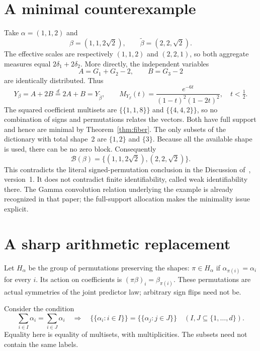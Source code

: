\documentclass[11pt]{article}
\theoremstyle{definition}\newtheorem{definition}[theorem]{Definition}
\theoremstyle{remark}\newtheorem{remark}[theorem]{Remark}
\newcommand{\B}{\mathcal B}
\newcommand{\eqd}{\overset{d}{=}}
\newcommand{\multiset}[1]{\{\!\{#1\}\!\}}
\begin{document}
\section{A minimal counterexample}\label{sec:counterexample}
Take $\alpha=(1,1,2)$ and
\[
 \beta=(1,1,2\sqrt2),\qquad \widetilde\beta=(2,2,\sqrt2).
\]
The effective scales are respectively $(1,1,2)$ and $(2,2,1)$, so both aggregate measures equal $2\delta_1+2\delta_2$. More directly, the independent variables
\[
 A=G_1+G_2-2,\qquad B=G_3-2
\]
are identically distributed. Thus
\[
 Y_\beta=A+2B\eqd2A+B=Y_{\widetilde\beta},\qquad
 M_{Y_\beta}(t)=\frac{e^{-6t}}{(1-t)^2(1-2t)^2},\quad t<\tfrac12.
\]
The squared coefficient multisets are $\multiset{1,1,8}$ and $\multiset{4,4,2}$, so no combination of signs and permutations relates the vectors. Both have full support and hence are minimal by Theorem~\ref{thm:fiber}. The only subsets of the dictionary with total shape~2 are $\{1,2\}$ and $\{3\}$. Because all the available shape is used, there can be no zero block. Consequently
\[
 \B(\beta)=\{(1,1,2\sqrt2),(2,2,\sqrt2)\}.
\]
This contradicts the literal signed-permutation conclusion in the Discussion of~\cite{BSS}, version~1. It does not contradict finite identifiability, called weak identifiability there. The Gamma convolution relation underlying the example is already recognized in that paper; the full-support allocation makes the minimality issue explicit.

\section{A sharp arithmetic replacement}
Let $H_\alpha$ be the group of permutations preserving the shapes: $\pi\in H_\alpha$ if $\alpha_{\pi(i)}=\alpha_i$ for every $i$. Its action on coefficients is $(\pi\beta)_i=\beta_{\pi(i)}$. These permutations are actual symmetries of the joint predictor law; arbitrary sign flips need not be.

Consider the condition
\begin{equation}\tag{SR}\label{eq:SR}
 \sum_{i\in I}\alpha_i=\sum_{i\in J}\alpha_i
 \quad\Longrightarrow\quad
 \multiset{\alpha_i:i\in I}=\multiset{\alpha_j:j\in J}
 \quad(I,J\subseteq\{1,\ldots,d\}).
\end{equation}
Equality here is equality of multisets, with multiplicities. The subsets need not contain the same labels.
\end{document}
